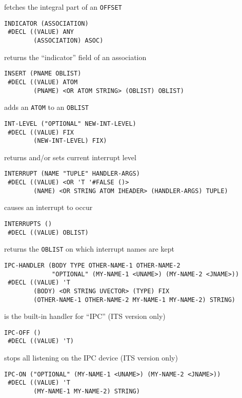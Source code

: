 \documentclass[a4paper]{scrbook}
\begin{document}
fetches the integral part of an \texttt{OFFSET}

\begin{verbatim}
INDICATOR (ASSOCIATION)
 #DECL ((VALUE) ANY
        (ASSOCIATION) ASOC)
\end{verbatim}

returns the ``indicator'' field of an association

\begin{verbatim}
INSERT (PNAME OBLIST)
 #DECL ((VALUE) ATOM
        (PNAME) <OR ATOM STRING> (OBLIST) OBLIST)
\end{verbatim}

adds an \texttt{ATOM} to an \texttt{OBLIST}

\begin{verbatim}
INT-LEVEL ("OPTIONAL" NEW-INT-LEVEL)
 #DECL ((VALUE) FIX
        (NEW-INT-LEVEL) FIX)
\end{verbatim}

returns and/or sets current interrupt level

\begin{verbatim}
INTERRUPT (NAME "TUPLE" HANDLER-ARGS)
 #DECL ((VALUE) <OR 'T '#FALSE ()>
        (NAME) <OR STRING ATOM IHEADER> (HANDLER-ARGS) TUPLE)
\end{verbatim}

causes an interrupt to occur

\begin{verbatim}
INTERRUPTS ()
 #DECL ((VALUE) OBLIST)
\end{verbatim}

returns the \texttt{OBLIST} on which interrupt names are kept

\begin{verbatim}
IPC-HANDLER (BODY TYPE OTHER-NAME-1 OTHER-NAME-2
             "OPTIONAL" (MY-NAME-1 <UNAME>) (MY-NAME-2 <JNAME>))
 #DECL ((VALUE) 'T
        (BODY) <OR STRING UVECTOR> (TYPE) FIX
        (OTHER-NAME-1 OTHER-NAME-2 MY-NAME-1 MY-NAME-2) STRING)
\end{verbatim}

is the built-in handler for ``IPC'' (ITS version only)

\begin{verbatim}
IPC-OFF ()
 #DECL ((VALUE) 'T)
\end{verbatim}

stops all listening on the IPC device (ITS version only)

\begin{verbatim}
IPC-ON ("OPTIONAL" (MY-NAME-1 <UNAME>) (MY-NAME-2 <JNAME>))
 #DECL ((VALUE) 'T
        (MY-NAME-1 MY-NAME-2) STRING)
\end{verbatim}
\end{document}
